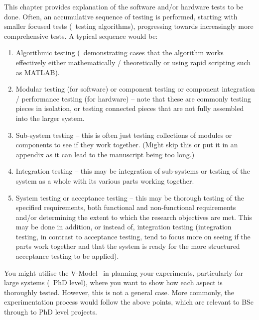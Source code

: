 \label{Ch:Experimentation}

This chapter provides explanation of the software and/or hardware tests to be done.  Often, an accumulative sequence of testing is performed, starting with smaller focused tests (\eg~testing algorithms), progressing towards increasingly more comprehensive tests.  A typical sequence would be:

\begin{enumerate}
  \item Algorithmic testing (\eg~demonstrating cases that the algorithm works effectively either mathematically / theoretically or using rapid scripting such as MATLAB).

  \item Modular testing (for software) or component testing or component integration / performance testing (for hardware) -- note that these are commonly testing pieces in isolation, or testing connected pieces that are not fully assembled into the larger system.

  \item Sub-system testing -- this is often just testing collections of modules or components to see if they work together. (Might skip this or put it in an appendix as it can lead to the manuscript being too long.)

  \item Integration testing -- this may be integration of sub-systems or testing of the system as a whole with its various parts working together.

  \item System testing or acceptance testing -- this may be thorough testing of the specified requirements, both functional and non-functional requirements and/or determining the extent to which the research objectives are met. This may be done in addition, or instead of, integration testing (integration testing, in contrast to acceptance testing, tend to focus more on seeing if the parts work together and that the system is ready for the more structured acceptance testing to be applied).
\end{enumerate}

You might utilise the V-Model~\cite{Graessler_2018} in planning your experiments, particularly for large systems (\eg~PhD level), where you want to show how each aspect is thoroughly tested. However, this is not a general case.  More commonly, the experimentation process would follow the above points, which are relevant to BSc through to PhD level projects.
